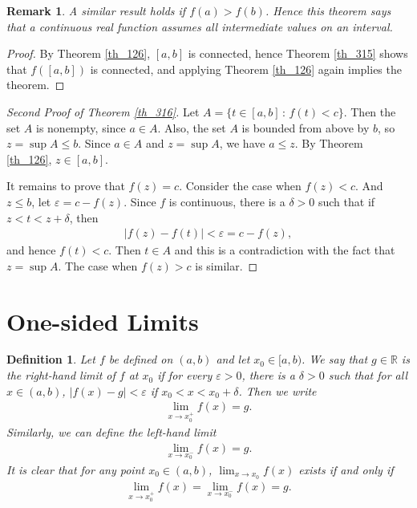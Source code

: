 \documentclass[10pt]{book}
\newtheorem{definition}{Definition}[chapter]
\newtheorem{remark}{Remark}[chapter]
\theoremstyle{definition}
\numberwithin{equation}{chapter}
\begin{document}
\begin{remark}
A similar result holds if $f(a) > f(b)$. Hence this theorem says that a continuous real function assumes all intermediate values on an interval.
\end{remark}

\begin{proof}
By Theorem \ref{th_126}, $[a,b]$ is connected, hence Theorem \ref{th_315} shows that $f([a,b])$ is connected, and applying Theorem \ref{th_126} again implies the theorem.
\end{proof}

\medskip

\begin{proof}[Second Proof of Theorem \ref{th_316}]
Let $A = \{t \in [a,b] \,:\, f(t) < c\}$. Then the set $A$ is nonempty, since $a \in A$. Also, the set $A$ is bounded from above by $b$, so $z = \sup A \leq b$. Since $a \in A$ and $z = \sup A$, we have $a \leq z$. By Theorem \ref{th_126}, $z \in [a,b]$.

It remains to prove that $f(z) = c$. Consider the case when $f(z) < c$. And $z \leq b$, let $\varepsilon = c - f(z)$. Since $f$ is continuous, there is a $\delta > 0$ such that if $z < t < z + \delta$, then
\begin{align*}
    \left|f(z) - f(t)\right| < \varepsilon = c - f(z),
\end{align*}
and hence $f(t) < c$. Then $t \in A$ and this is a contradiction with the fact that $z = \sup A$. The case when $f(z) > c$ is similar.
\end{proof}

\medskip






\section{One-sided Limits}


\begin{definition}
Let $f$ be defined on $(a,b)$ and let $x_0 \in [a,b)$. We say that $g \in \mathbb{R}$ is the right-hand limit of $f$ at $x_0$ if for every $\varepsilon > 0$, there is a $\delta > 0$ such that for all $x \in (a,b)$, $\left|f(x) - g\right| < \varepsilon$ if $x_0 < x < x_0 + \delta$. Then we write
\begin{align*}
    \lim_{x \to x_0^+} f(x) = g.
\end{align*}
Similarly, we can define the left-hand limit
\begin{align*}
    \lim_{x \to x_0^-} f(x) = g.
\end{align*}
It is clear that for any point $x_0 \in (a,b)$, $\lim_{x \to x_0}f(x)$ exists if and only if 
\begin{align*}
    \lim_{x \to x_0^+} f(x) = \lim_{x \to x_0^-} f(x) = g.
\end{align*}
\end{definition}
\end{document}
